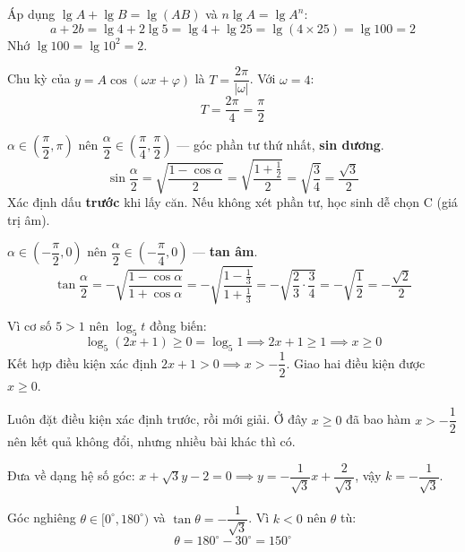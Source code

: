 \documentclass[11pt, a4paper]{article}
\begin{document}
\begin{dapan}[8 — Đáp án C]
Áp dụng $\lg A+\lg B=\lg(AB)$ và $n\lg A=\lg A^n$:
\[
a+2b=\lg 4+2\lg 5=\lg 4+\lg 25=\lg(4\times 25)=\lg 100=2
\]
 Nhớ $\lg 100 = \lg 10^2 = 2$.
\end{dapan}

\begin{dapan}[9 — Đáp án B]
Chu kỳ của $y=A\cos(\omega x+\varphi)$ là $T=\dfrac{2\pi}{|\omega|}$. Với $\omega=4$:
\[
T=\frac{2\pi}{4}=\frac{\pi}{2}
\]
\end{dapan}

\begin{dapan}[10 — Đáp án A]
$\alpha \in \left(\dfrac{\pi}{2},\pi\right)$ nên $\dfrac{\alpha}{2} \in \left(\dfrac{\pi}{4},\dfrac{\pi}{2}\right)$ — góc phần tư thứ nhất, \textbf{sin dương}.
\[
\sin\frac{\alpha}{2}=\sqrt{\frac{1-\cos\alpha}{2}}=\sqrt{\frac{1+\frac{1}{2}}{2}}=\sqrt{\frac{3}{4}}=\frac{\sqrt{3}}{2}
\]
 Xác định dấu \textbf{trước} khi lấy căn. Nếu không xét phần tư, học sinh dễ chọn C (giá trị âm).
\end{dapan}

\begin{dapan}[11 — Đáp án C]
$\alpha \in \left(-\dfrac{\pi}{2},0\right)$ nên $\dfrac{\alpha}{2} \in \left(-\dfrac{\pi}{4},0\right)$ — \textbf{tan âm}.
\[
\tan\frac{\alpha}{2}=-\sqrt{\frac{1-\cos\alpha}{1+\cos\alpha}}=-\sqrt{\frac{1-\frac{1}{3}}{1+\frac{1}{3}}}=-\sqrt{\frac{2}{3}\cdot\frac{3}{4}}=-\sqrt{\frac{1}{2}}=-\frac{\sqrt{2}}{2}
\]
\end{dapan}

\begin{dapan}[12 — Đáp án D]
Vì cơ số $5>1$ nên $\log_5 t$ đồng biến:
\[
\log_5(2x+1)\ge 0=\log_5 1 \implies 2x+1\ge 1 \implies x\ge 0
\]
Kết hợp điều kiện xác định $2x+1>0 \implies x>-\dfrac{1}{2}$. Giao hai điều kiện được $x\ge 0$.

 Luôn đặt điều kiện xác định trước, rồi mới giải. Ở đây $x\ge 0$ đã bao hàm $x>-\dfrac{1}{2}$ nên kết quả không đổi, nhưng nhiều bài khác thì có.
\end{dapan}

\clearpage
{}

\begin{dapan}[13 — Đáp án C]
Đưa về dạng hệ số góc: $x+\sqrt{3}y-2=0 \implies y=-\dfrac{1}{\sqrt{3}}x+\dfrac{2}{\sqrt{3}}$, vậy $k=-\dfrac{1}{\sqrt{3}}$.

Góc nghiêng $\theta \in [0^\circ,180^\circ)$ và $\tan\theta=-\dfrac{1}{\sqrt{3}}$. Vì $k<0$ nên $\theta$ tù:
\[
\theta=180^\circ-30^\circ=150^\circ
\]
\end{dapan}
\end{document}
